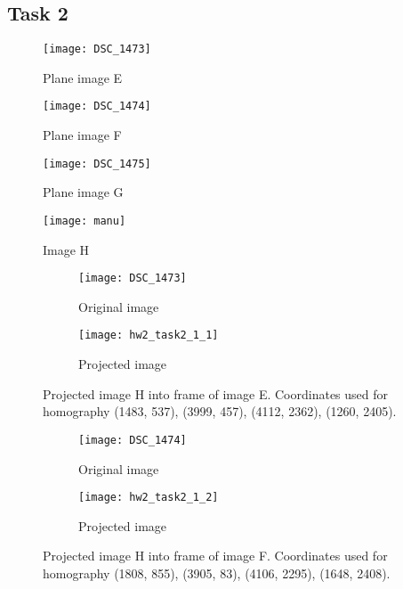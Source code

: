 \documentclass[11pt]{article}
\begin{document}
\subsection*{Task 2}

\begin{figure}[H]
\centering
\texttt{[image: DSC\_1473]}
\caption{Plane image E}
\label{}
\end{figure}

\begin{figure}[H]
\centering
\texttt{[image: DSC\_1474]}
\caption{Plane image F}
\label{}
\end{figure}

\begin{figure}[H]
\centering
\texttt{[image: DSC\_1475]}
\caption{Plane image G}
\label{}
\end{figure}

\begin{figure}[H]
\centering
\texttt{[image: manu]}
\caption{Image H}
\label{}
\end{figure}

\begin{figure}[H]
\begin{subfigure}{.5\textwidth}
  \centering
  \texttt{[image: DSC\_1473]}
  \caption{Original image}
  \label{}
\end{subfigure}
\begin{subfigure}{.5\textwidth}
  \centering
  \texttt{[image: hw2\_task2\_1\_1]}
  \caption{Projected image}
  \label{}
\end{subfigure}
\caption{Projected image H into frame of image E. Coordinates used for homography (1483, 537), (3999, 457), (4112, 2362), (1260, 2405).}
\end{figure}

\begin{figure}[H]
\begin{subfigure}{.5\textwidth}
  \centering
  \texttt{[image: DSC\_1474]}
  \caption{Original image}
  \label{}
\end{subfigure}
\begin{subfigure}{.5\textwidth}
  \centering
  \texttt{[image: hw2\_task2\_1\_2]}
  \caption{Projected image}
  \label{}
\end{subfigure}
\caption{Projected image H into frame of image F. Coordinates used for homography (1808, 855), (3905, 83), (4106, 2295), (1648, 2408).}
\end{figure}
\end{document}
